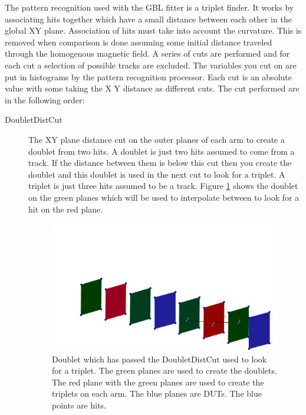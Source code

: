 The pattern recognition used with the GBL fitter is a triplet finder. It works by associating hits together which have a small distance between each other in the global XY plane. Association of hits must take into account the curvature. This is removed when comparison is done assuming some initial distance traveled through the homogenous magnetic field. A series of cuts are performed and for each cut a selection of possible tracks are excluded. The variables you cut on are put in histograms by the pattern recognition processor. Each cut is an absolute value with some taking the X Y distance as different cuts. The cut performed are in the following order:

\begin{description} 
\item[DoubletDistCut]  The XY plane distance cut on the outer planes of each arm to create a doublet from two hits. A doublet  is just two hits assumed to come from a track. If the distance between them is below this cut then you create the doublet and this doublet is used in the next cut to look for a triplet. A triplet is just three hits assumed to be a track. Figure \ref{fig:TripForm} shows the doublet on the green planes which will be used to interpolate between to look for a hit on the red plane. 
\begin{figure}[H]
\centering
\includegraphics[width=1.0\linewidth]{figures/tripletDoubletFormed.png}
\caption{Doublet which has passed the DoubletDistCut used to look for a triplet. The green planes are used to create the doublets. The red plane with the green planes are used to create the triplets on each arm. The blue planes are DUTs. The blue points are hits.}
\label{fig:TripForm}
\end{figure}


\end{description}
